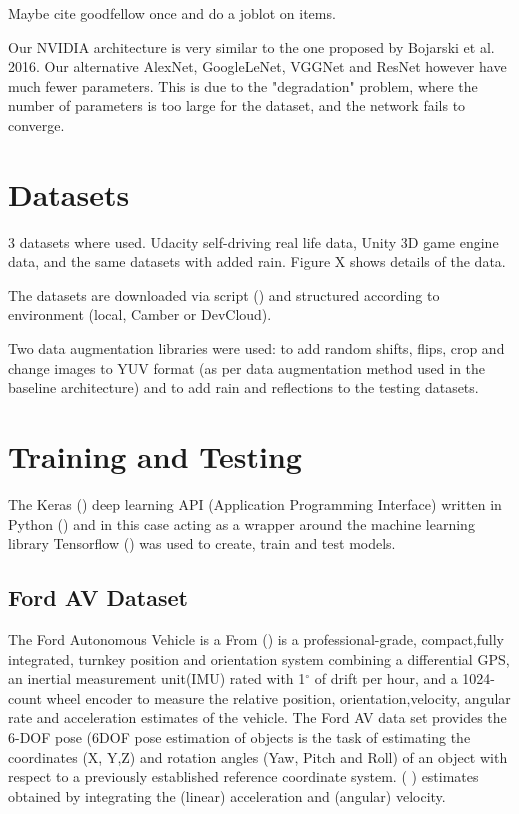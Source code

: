 Maybe cite goodfellow once and do a joblot on items.  

Our NVIDIA architecture is very similar to the one proposed by Bojarski et al. 2016. Our alternative AlexNet, GoogleLeNet, VGGNet and ResNet however have much fewer parameters. This is due to the "degradation" problem, where the number of parameters is too large for the dataset, and the network fails to converge.

\section{Datasets}
3 datasets where used. Udacity self-driving real life data, Unity 3D game engine data, and the same datasets with added rain. Figure X shows details of the data.

The datasets are downloaded via script (\cite{Sikar2020}) and structured according to environment (local, Camber or DevCloud).

Two data augmentation libraries were used: \cite{Naoki2016} to add random shifts, flips, crop and change images to YUV format (as per \cite{bojarski2016end} data augmentation method used in the baseline architecture) and \cite{Saxena2017} to add rain and reflections to the testing datasets.

\section{Training and Testing}

The Keras (\cite{chollet2015keras}) deep learning API (Application Programming Interface) written in Python (\cite{van1995python}) and in this case acting as a wrapper around the machine learning library Tensorflow (\cite{abadi2016tensorflow})  was used to create, train and test models.

\subsection{Ford AV Dataset}
The Ford Autonomous Vehicle is a 
From %
 (\cite{Applanix}) is a professional-grade, compact,fully  integrated,  turnkey  position  and  orientation  system combining a differential GPS, an inertial measurement unit(IMU)  rated  with  1$^{\circ}$ of  drift  per  hour,  and  a  1024-count wheel encoder to measure the relative position, orientation,velocity,  angular  rate  and  acceleration  estimates  of  the vehicle. The Ford AV data set provides the 6-DOF pose (6DOF pose estimation of objects is the task of estimating the coordinates (X, Y,Z) and rotation angles (Yaw, Pitch and Roll) of an object with respect to a previously established reference coordinate system. (\cite{7005077} ) estimates obtained by integrating the (linear) acceleration and (angular) velocity.

